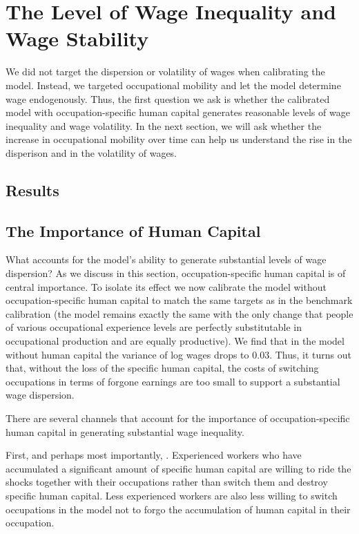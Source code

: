 \documentclass[12pt]{article}
\newcommand{\highlightP}[1]{{\emph{\color{MyPink}{#1}}}}
\theoremstyle{definition}
\begin{document}
\section{The Level of Wage Inequality and Wage Stability}

We did not target the dispersion or volatility of wages when calibrating the model. Instead, we targeted occupational mobility and let the model determine wage endogenously. Thus, the first question we ask is whether the calibrated model with occupation-specific human capital generates reasonable levels of wage inequality and wage volatility. In the next section, we will ask whether the increase in occupational mobility over time can help us understand the rise in the disperison and in the volatility of wages. 

\subsection{Results}

\subsection{The Importance of Human Capital}

What accounts for the model's ability to generate substantial levels of wage dispersion? As we discuss in this section, occupation-specific human capital is of central importance. To isolate its effect we now calibrate the model without occupation-specific human capital to match the same targets as in the benchmark calibration (the model remains exactly the same with the only change that people of various occupational experience levels are perfectly substitutable in occupational production and are equally productive). We find that in the model without human capital the variance of log wages drops to $0.03$. Thus, it turns out that, without the loss of the specific human capital, the costs of switching occupations in terms of forgone earnings are too small to support a substantial wage dispersion.

There are several channels that account for the importance of occupation-specific human capital in generating substantial wage inequality.

First, and perhaps most importantly, \highlightP{the presence of human capital generates a lock-in effect}. Experienced workers who have accumulated a significant amount of specific human capital are willing to ride the shocks together with their occupations rather than switch them and destroy specific human capital. Less experienced workers are also less willing to switch occupations in the model not to forgo the accumulation of human capital in their occupation.
\end{document}
